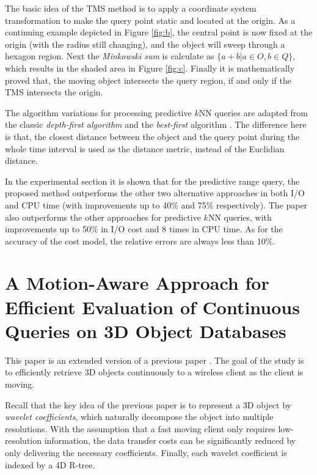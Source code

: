 \documentclass[paper=a4, fontsize=18pt]{article} %
\numberwithin{equation}{section} %
\numberwithin{figure}{section} %
\numberwithin{table}{section} %
\begin{document}
The basic idea of the TMS method is to apply a coordinate system transformation to make the query point static and located at the origin. As a continuing example depicted in Figure \ref{fig:b}, the central point is now fixed at the origin (with the radius still changing), and the object will sweep through a hexagon region. Next the \emph{Minkowski sum} \cite{E96} is calculate as $\{a + b | a\in O, b \in Q\}$, which results in the shaded area in Figure \ref{fig:c}. Finally it is mathematically proved that, the moving object intersects the query region, if and only if the TMS intersects the origin.

The algorithm variations for processing predictive $k$NN queries are adapted from the classic \emph{depth-first algorithm} \cite{RKV95} and the \emph{best-first} algorithm \cite{HS95}. The difference here is that, the closest distance between the object and the query point during the whole time interval is used as the distance metric, instead of the Euclidian distance.

In the experimental section it is shown that for the predictive range query, the proposed method outperforms the other two alternative approaches in both I/O and CPU time (with improvements up to 40\% and 75\% respectively). The paper also outperforms the other approaches for predictive $k$NN queries, with improvements up to 50\% in I/O cost and 8 times in CPU time. As for the accuracy of the cost model, the relative errors are always less than 10\%.

\section{A Motion-Aware Approach for Efficient Evaluation of Continuous Queries on 3D Object Databases \cite{ATZK10}}

This paper is an extended version of a previous paper \cite{AZTK08}. The goal of the study is to efficiently retrieve 3D objects continuously to a wireless client as the client is moving.

Recall that the key idea of the previous paper is to represent a 3D object by \emph{wavelet coefficients}, which naturally decompose the object into multiple resolutions. With the assumption that a fast moving client only requires low-resolution information, the data transfer costs can be significantly reduced by only delivering the necessary coefficients. Finally, each wavelet coefficient is indexed by a 4D R-tree.
\end{document}

